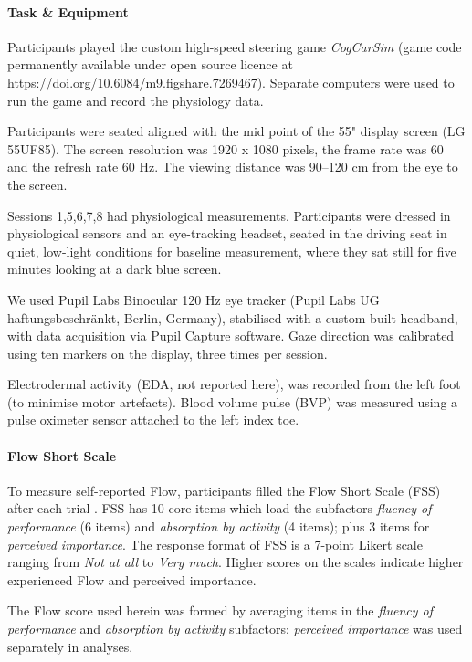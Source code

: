 \paragraph{Task \& Equipment} Participants played the custom high-speed steering game {\it CogCarSim} (game code permanently available under open source licence at \url{https://doi.org/10.6084/m9.figshare.7269467}). Separate computers were used to run the game and record the physiology data.

Participants were seated aligned with the mid point of the 55" display screen (LG 55UF85). The screen resolution was 1920 x 1080 pixels, the frame rate was 60 and the refresh rate 60 Hz. The viewing distance was 90--120 cm from the eye to the screen.

Sessions 1,5,6,7,8 had physiological measurements. Participants were dressed in physiological sensors and an eye-tracking headset, seated in the driving seat in quiet, low-light conditions for baseline measurement, where they sat still for five minutes looking at a dark blue screen.

We used Pupil Labs Binocular 120 Hz eye tracker (Pupil Labs UG haftungsbeschränkt, Berlin, Germany), stabilised with a custom-built headband, with data acquisition via Pupil Capture software. Gaze direction was calibrated using ten markers on the display, three times per session.

Electrodermal activity (EDA, not reported here),  was recorded from the left foot (to minimise motor artefacts). Blood volume pulse (BVP) was measured using a pulse oximeter sensor attached to the left index toe.

\paragraph{Flow Short Scale} To measure self-reported Flow, participants filled the Flow Short Scale (FSS) after each trial \cite{Rheinberg2003,Engeser2008}. FSS has 10 core items which load the subfactors {\it fluency of performance} (6 items) and {\it absorption by activity} (4 items); plus 3 items for {\it perceived importance}. The response format of FSS is a 7-point Likert scale ranging from {\it Not at all} to {\it Very much}. Higher scores on the scales indicate higher experienced Flow and perceived importance.

The Flow score used herein was formed by averaging items in the {\it fluency of performance} and {\it absorption by activity} subfactors; {\it perceived importance} was used separately in analyses.

